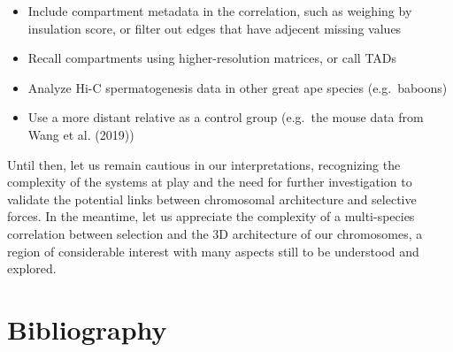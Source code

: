 \documentclass[
  11pt,
  a4paper,
]{scrbook}
\providecommand{\tightlist}{%
  \setlength{\itemsep}{0pt}\setlength{\parskip}{0pt}}\usepackage{longtable,booktabs,array}
\begin{document}
\begin{itemize}
\tightlist
\item
  Include compartment metadata in the correlation, such as weighing by
  insulation score, or filter out edges that have adjecent missing
  values
\item
  Recall compartments using higher-resolution matrices, or call TADs
\item
  Analyze Hi-C spermatogenesis data in other great ape species
  (e.g.~baboons)
\item
  Use a more distant relative as a control group (e.g.~the mouse data
  from Wang et al. (2019))
\end{itemize}

Until then, let us remain cautious in our interpretations, recognizing
the complexity of the systems at play and the need for further
investigation to validate the potential links between chromosomal
architecture and selective forces. In the meantime, let us appreciate
the complexity of a multi-species correlation between selection and the
3D architecture of our chromosomes, a region of considerable interest
with many aspects still to be understood and explored.

\chapter*{Bibliography}\label{bibliography}
\end{document}
